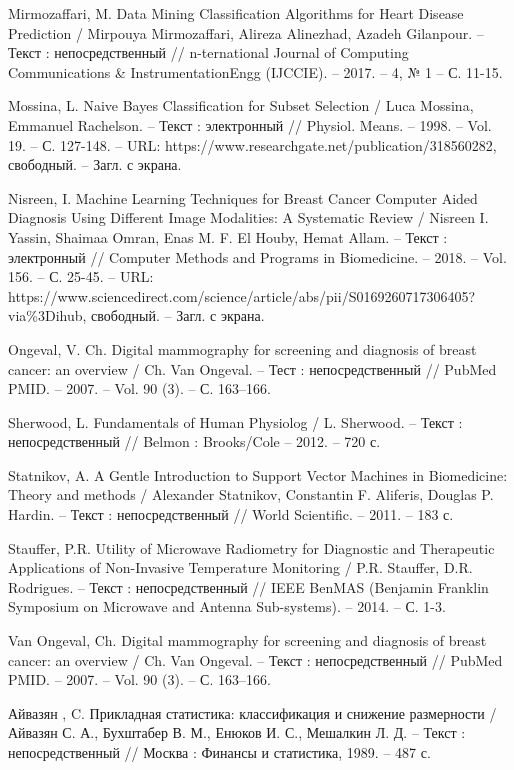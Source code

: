 \begin{thebibliography}{3}
	 Mirmozaffari, M. Data Mining Classification Algorithms for Heart Disease Prediction / Mirpouya Mirmozaffari, Alireza Alinezhad, Azadeh Gilanpour. -- Текст : непосредственный // n-ternational Journal of Computing Communications \& InstrumentationEngg (IJCCIE). -- 2017. -- 4, № 1 -- С. 11-15.
	
	 Mossina, L. Naive Bayes Classification for Subset Selection / Luca Mossina, Emmanuel Rachelson. -- Текст : электронный // Physiol. Means. -- 1998. -- Vol. 19. -- С. 127-148. -- URL: https://www.researchgate.net/publication/318560282, свободный. -- Загл. с экрана.
	
	 Nisreen, I. Machine Learning Techniques for Breast Cancer Computer Aided Diagnosis Using Different Image Modalities: A Systematic Review / Nisreen I. Yassin, Shaimaa Omran, Enas M. F. El Houby, Hemat Allam. -- Текст : электронный // Computer Methods and Programs in Biomedicine. -- 2018. -- Vol. 156. -- С. 25-45. -- URL: https://www.sciencedirect.com/science/article/abs/pii/S0169260717306405?via\%3Dihub, свободный. -- Загл. с экрана.
	
	 Ongeval, V. Ch. Digital mammography for screening and diagnosis of breast cancer:
	an overview / Ch. Van Ongeval. -- Тест : непосредственный // PubMed PMID. -- 2007. -- Vol. 90 (3). -- С. 163–166.
	
	 Sherwood, L. Fundamentals of Human Physiolog / L. Sherwood. -- Текст : непосредственный // Belmon : Brooks/Cole -- 2012. -- 720 с.
	
	 Statnikov, A. A Gentle Introduction to Support Vector Machines in Biomedicine: Theory and methods / Alexander Statnikov, Constantin F. Aliferis, Douglas P. Hardin. -- Текст : непосредственный // World Scientific. -- 2011. -- 183 с.
	
	 Stauffer, P.R. Utility of Microwave Radiometry for Diagnostic and Therapeutic Applications of Non-Invasive Temperature Monitoring / P.R. Stauffer, D.R. Rodrigues. -- Текст : непосредственный // IEEE BenMAS (Benjamin Franklin Symposium on Microwave and Antenna Sub-systems). -- 2014. -- С. 1-3.
	
	 Van Ongeval, Ch. Digital mammography for screening and diagnosis of breast cancer:
	an overview / Ch. Van Ongeval. -- Текст : непосредственный // PubMed PMID. -- 2007. -- Vol. 90 (3). -- С. 163–166.
	
	 Айвазян , C. Прикладная статистика: классификация и снижение размерности / Айвазян С. А., Бухштабер В. М., Енюков И. С., Мешалкин Л. Д. -- Текст : непосредственный // Москва : Финансы и статистика, 1989. -- 487 с.
	

\end{thebibliography}
